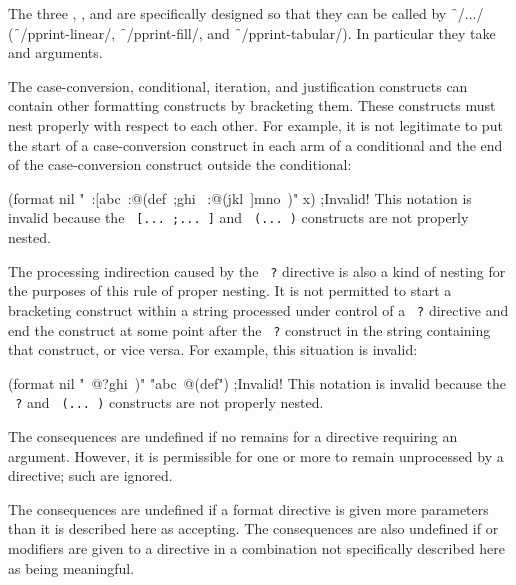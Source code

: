 The three  
      ,
      ,
  and 
are specifically designed so that they can be called by \f{~/.../}
(\ie \f{~/pprint-linear/}, \f{~/pprint-fill/}, and \f{~/pprint-tabular/}).
In particular they take  and  arguments.

\endlist
{}


The case-conversion, conditional, iteration, and justification
constructs can contain other formatting constructs by bracketing them.
These constructs must nest properly with respect to each other.
For example, it is not legitimate to put the start of a case-conversion
construct in each arm of a conditional and the
end of the case-conversion construct outside the conditional:

\code
 (format nil "~:[abc~:@(def~;ghi~
:@(jkl~]mno~)" x) ;Invalid!
\endcode
This notation is invalid because the {\tt ~[...~;...~]}
and {\tt ~(...~)} constructs are not properly nested.
                                   
The processing indirection caused by the {\tt ~?} directive
is also a kind of nesting for the purposes of this rule of proper nesting.
It is not permitted to
start a bracketing construct within a string processed
under control of a {\tt ~?}                                      
directive and end the construct at some point after the {\tt ~?} construct
in the string containing that construct, or vice versa.
For example, this situation is invalid:
                                                                               
\code
 (format nil "~@?ghi~)" "abc~@(def") ;Invalid!
\endcode
This notation
is invalid because the {\tt ~?}
and {\tt ~(...~)} constructs are not properly nested.


The consequences are undefined if no  remains for a directive 
requiring an argument.  However, it is permissible for one or more  
to remain unprocessed by a directive; such  are ignored.
 
The consequences are undefined if a format directive is given more parameters 
than it is described here as accepting.  The consequences are also undefined
if  or  modifiers are given to a directive in a combination not
specifically described here as being meaningful.

